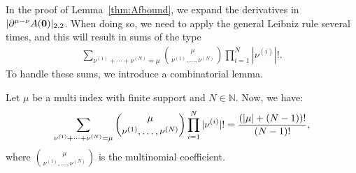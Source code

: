 In the proof of Lemma~\ref{thm:Afbound}, we expand the derivatives in $|\partial^{\mu-\nu}{A}(\bm{0}) |_{2,2}$.
When doing so, we need to apply the general Leibniz rule several times, and this will result in sums of the type
\begin{align*}
	\sum_{\nu^{(1)}+\cdots+\nu^{(N)}=\mu} \binom{\mu }{ \nu^{(1)},\ldots,\nu^{(N)}}\prod_{i=1}^N |\nu^{(i)}|!.
\end{align*}
To handle these sums, we introduce a combinatorial lemma.

\begin{lemma} \label{lem:multinomialsum}
	Let $\mu$ be a multi index with finite support and $N\in\mathbb{N}$.
	Now, we have:
	\begin{equation*}
		\sum_{\nu^{(1)}+\cdots+\nu^{(N)}=\mu} \binom{\mu }{ \nu^{(1)},\ldots,\nu^{(N)}}\prod_{i=1}^N |\nu^{(i)}|! = \frac{(\left|\mu\right|+(N-1))!}{(N-1)!},
	\end{equation*}
	where $\binom{\mu }{ \nu^{(1)},\ldots,\nu^{(N)}}$ is the multinomial coefficient.
\end{lemma}


